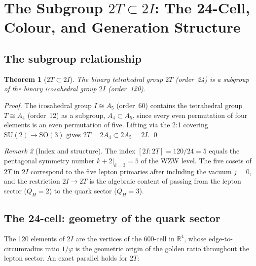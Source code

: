 \documentclass[11pt,a4paper]{article}
\newtheorem{theorem}{Theorem}[section]
\theoremstyle{definition}\newtheorem{definition}[theorem]{Definition}
\theoremstyle{remark}
\newtheorem{remark}[theorem]{Remark}
\newcommand{\vp}{\varphi}
\newcommand{\SU}{\mathrm{SU}}
\newcommand{\twoI}{2I}
\newcommand{\twoT}{2T}
\newcommand{\QH}{Q_H}
\begin{document}
\section{The Subgroup $2T\subset 2I$: The 24-Cell, Colour, and Generation Structure}
\label{P15:sec:2T2I}

\subsection{The subgroup relationship}

\begin{theorem}[$2T\subset 2I$]
\label{P15:thm:subgroup}
The binary tetrahedral group $\twoT$ (order~24) is a subgroup of
the binary icosahedral group $\twoI$ (order~120).
\end{theorem}

\begin{proof}
The icosahedral group $I\cong A_5$ (order~60) contains the
tetrahedral group $T\cong A_4$ (order~12) as a subgroup,
$A_4\subset A_5$, since every even permutation of four elements
is an even permutation of five.
Lifting via the 2:1 covering $\SU(2)\to\mathrm{SO}(3)$ gives
$\twoT = 2A_4\subset 2A_5 = \twoI$.
\qed
\end{proof}

\begin{remark}[Index and structure]
\label{P15:rem:index_and_structure}
The index $[\twoI:\twoT]=120/24=5$ equals the pentagonal
symmetry number $k+2\big|_{k=3}=5$ of the WZW level.
The five cosets of $\twoT$ in $\twoI$
correspond to the five lepton primaries after including the
vacuum $j=0$, and the restriction $\twoI\to\twoT$ is the algebraic
content of passing from the lepton sector ($\QH=2$) to the
quark sector ($\QH=3$).
\end{remark}

\subsection{The 24-cell: geometry of the quark sector}

The 120 elements of $\twoI$ are the vertices of the 600-cell in $\mathbb{R}^4$,
whose edge-to-circumradius ratio $1/\vp$ is the geometric origin of the
golden ratio throughout the lepton sector.
An exact parallel holds for $\twoT$:
\end{document}
